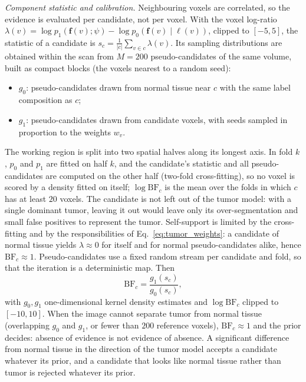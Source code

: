 \documentclass[fleqn,10pt]{olplainarticle}
\begin{document}
\textit{Component statistic and calibration.} Neighbouring voxels are correlated, so the evidence is evaluated per
candidate, not per voxel. With the voxel log-ratio $\lambda(v)=\log p_1(\mathbf{f}(v);\psi)-\log
p_0(\mathbf{f}(v)\mid\ell(v))$, clipped to $[-5,5]$, the statistic of a candidate is $s_c=\frac{1}{|c|}\sum_{v\in c}\lambda(v)$.
Its sampling distributions are obtained within the scan from $M=200$ pseudo-candidates of the same volume, built as compact
blocks (the voxels nearest to a random seed):
\begin{itemize}
\item $g_0$: pseudo-candidates drawn from normal tissue near $c$ with the same label composition as $c$;
\item $g_1$: pseudo-candidates drawn from candidate voxels, with seeds sampled in proportion to the weights $w_v$.
\end{itemize}
The working region is split into two spatial halves along its longest axis. In fold $k$, $p_0$ and $p_1$ are fitted on half
$k$, and the candidate's statistic and all pseudo-candidates are computed on the other half (two-fold cross-fitting), so no
voxel is scored by a density fitted on itself; $\log\mathrm{BF}_c$ is the mean over the folds in which $c$ has at least $20$
voxels. The candidate is not left out of the tumor model: with a single dominant tumor, leaving it out would leave only its
over-segmentation and small false positives to represent the tumor. Self-support is limited by the cross-fitting and by the
responsibilities of Eq.~\eqref{eq:tumor_weights}: a candidate of normal tissue yields $\lambda\approx0$ for itself and for
normal pseudo-candidates alike, hence $\mathrm{BF}_c\approx1$. Pseudo-candidates use a fixed random stream per candidate and
fold, so that the iteration is a deterministic map. Then
\begin{equation}
\label{eq:bf}
\mathrm{BF}_c=\frac{g_1(s_c)}{g_0(s_c)},
\end{equation}
with $g_0,g_1$ one-dimensional kernel density estimates and $\log\mathrm{BF}_c$ clipped to $[-10,10]$. When the image
cannot separate tumor from normal tissue (overlapping $g_0$ and $g_1$, or fewer than $200$ reference voxels),
$\mathrm{BF}_c\approx1$ and the prior decides: absence of evidence is not evidence of absence. A significant difference
from normal tissue in the direction of the tumor model accepts a candidate whatever its prior, and a candidate that looks
like normal tissue rather than tumor is rejected whatever its prior.
\end{document}
